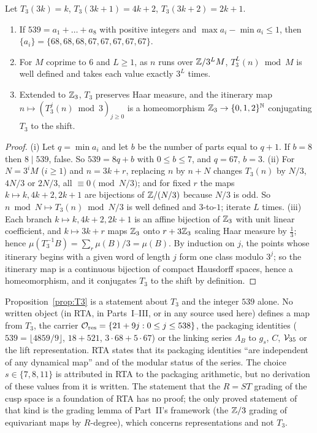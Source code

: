 \begin{proposition}\label{prop:T3}
Let $T_3(3k)=k$, $T_3(3k+1)=4k+2$, $T_3(3k+2)=2k+1$.
\begin{enumerate}[label=(\roman*)]
\item If $539=a_1+\dots+a_8$ with positive integers and $\max a_i-\min a_i\le1$, then $\{a_i\}=\{68,68,68,67,67,67,67,67\}$.
\item For $M$ coprime to $6$ and $L\ge1$, as $n$ runs over $\mathbb{Z}/3^LM$, $T_3^L(n)\bmod M$ is well defined and takes each value exactly $3^L$ times.
\item Extended to $\mathbb{Z}_3$, $T_3$ preserves Haar measure, and the itinerary map $n\mapsto(T_3^j(n)\bmod 3)_{j\ge0}$ is a homeomorphism $\mathbb{Z}_3\to\{0,1,2\}^{\mathbb{N}}$ conjugating $T_3$ to the shift.
\end{enumerate}
\end{proposition}
\begin{proof}
(i) Let $q=\min a_i$ and let $b$ be the number of parts equal to $q+1$. If $b=8$ then $8\mid539$, false. So $539=8q+b$ with $0\le b\le7$, and $q=67$, $b=3$.
(ii) For $N=3^iM$ ($i\ge1$) and $n=3k+r$, replacing $n$ by $n+N$ changes $T_3(n)$ by $N/3$, $4N/3$ or $2N/3$, all $\equiv0\pmod{N/3}$; and for fixed $r$ the maps
$k\mapsto k,4k+2,2k+1$ are bijections of $\mathbb{Z}/(N/3)$ because $N/3$ is odd. So $n\bmod N\mapsto T_3(n)\bmod N/3$ is well defined and $3$-to-$1$; iterate $L$ times.
(iii) Each branch $k\mapsto k,4k+2,2k+1$ is an affine bijection of $\mathbb{Z}_3$ with unit linear coefficient, and $k\mapsto3k+r$ maps $\mathbb{Z}_3$ onto $r+3\mathbb{Z}_3$ scaling Haar measure
by $\frac13$; hence $\mu(T_3^{-1}B)=\sum_r\mu(B)/3=\mu(B)$. By induction on $j$, the points whose itinerary begins with a given word of length $j$ form one class modulo $3^j$;
so the itinerary map is a continuous bijection of compact Hausdorff spaces, hence a homeomorphism, and it conjugates $T_3$ to the shift by definition.
\end{proof}

\begin{remark}\label{rem:nolink}
Proposition~\ref{prop:T3} is a statement about $T_3$ and the integer $539$ alone. No written object (in RTA, in Parts~I--III, or in any source used here) defines a map
from $T_3$, the carrier $\mathcal O_{\rm res}=\{21+9j:0\le j\le538\}$, the packaging identities ($539=\lfloor4859/9\rfloor$, $18+521$, $3\cdot68+5\cdot67$) or the linking series
$\Lambda_B$ to $g_s$, $C$, $\mathcal V_{35}$ or the lift representation. RTA states that its packaging identities ``are independent of any dynamical map'' and of the modular status of
the series. The choice $s\in\{7,8,11\}$ is attributed in RTA to the packaging arithmetic, but no derivation of these values from it is written. The statement that the
$R=ST$ grading of the cusp space is a foundation of RTA has no proof; the only proved statement of that kind is the grading lemma of Part~II's framework (the $\mathbb{Z}/3$ grading
of equivariant maps by $R$-degree), which concerns representations and not $T_3$.
\end{remark}

